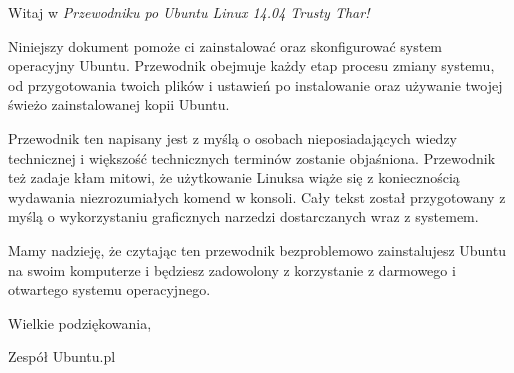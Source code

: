 \noindent Witaj w \emph{Przewodniku po Ubuntu Linux 14.04 Trusty Thar!}

Niniejszy dokument pomoże ci zainstalować oraz skonfigurować system operacyjny Ubuntu. Przewodnik obejmuje każdy etap procesu zmiany systemu, od przygotowania twoich plików i ustawień po instalowanie oraz używanie twojej świeżo zainstalowanej kopii Ubuntu.

Przewodnik ten napisany jest z myślą o osobach nieposiadających wiedzy technicznej i większość technicznych terminów zostanie objaśniona. Przewodnik też zadaje kłam mitowi, że użytkowanie Linuksa wiąże się z koniecznością wydawania niezrozumiałych komend w konsoli. Cały tekst został przygotowany z myślą o wykorzystaniu graficznych narzedzi dostarczanych wraz z systemem.

Mamy nadzieję, że czytając ten przewodnik bezproblemowo zainstalujesz Ubuntu na swoim komputerze i będziesz zadowolony z korzystanie z darmowego i otwartego systemu operacyjnego.

Wielkie podziękowania,

Zespół Ubuntu.pl

\clearpage
